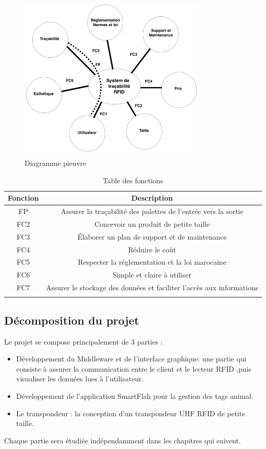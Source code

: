 \documentclass[11pt, a4paper, twoside]{book}
\begin{document}
\begin{figure}[H]
\centering
\includegraphics[width=9cm,height=8cm]{pieuvre}
\caption{Diagramme pieuvre}
\end{figure}


\begin{longtable}{|c|c|}
\hline
\textbf{Fonction} & \textbf{Description} \\
\hline
FP & Assurer la traçabilité des palettes de l'entrée vers la sortie  \\
\hline
FC2 & Concevoir un produit de petite taille  \\
\hline
FC3 & Élaborer un plan de support et de maintenance  \\
\hline
FC4 & Réduire le coût   \\
\hline
FC5 & Respecter la réglementation et la loi marocaine \\
\hline
FC6 & Simple et claire à utiliser \\
\hline
FC7 & Assurer le stockage des données et faciliter l'accès aux informations \\
\hline
\caption{Table des fonctions}
\end{longtable}



\subsection{Décomposition du projet}
Le projet se compose principalement de 3 parties :
\begin{itemize}
\item Développement du Middleware et de l'interface graphique: une partie qui consiste à assurer la communication entre le client et le lecteur RFID ,puis visualiser les données lues à l'utilisateur.
\item Développement de l'application SmartFlah pour la gestion des tags animal.
\item Le transpondeur : la conception d'un transpondeur UHF RFID de petite taille.\\
\end{itemize}
Chaque partie sera étudiée indépendamment dans les chapitres qui suivent.
\end{document}
